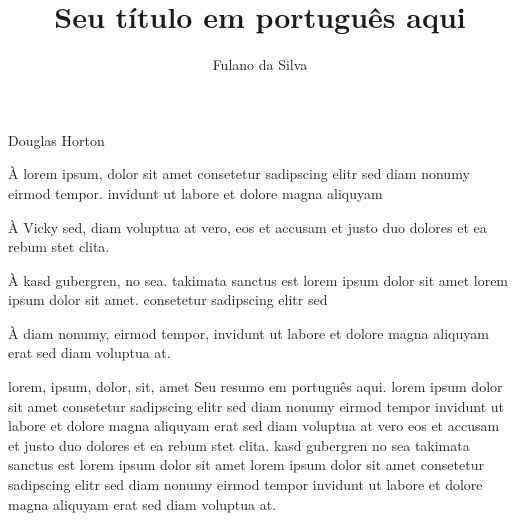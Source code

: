 \documentclass[portuguese]{pucrs-ppgcc}
\author{Fulano da Silva}
\title{Seu título em português aqui}
      {Your title in english here}
\begin{document}

         {Douglas Horton}


\begin{agradecimentos}
À lorem ipsum, dolor sit amet consetetur sadipscing elitr sed diam
nonumy eirmod tempor. invidunt ut labore et dolore magna aliquyam

À Vicky sed, diam voluptua at vero, eos et accusam et justo duo
dolores et ea rebum stet clita.

À kasd gubergren, no sea. takimata sanctus est lorem ipsum dolor sit
amet lorem ipsum dolor sit amet. consetetur sadipscing elitr sed

À diam nonumy, eirmod tempor, invidunt ut labore et dolore magna
aliquyam erat sed diam voluptua at.
\end{agradecimentos}

\begin{resumo}{lorem, ipsum, dolor, sit, amet}
Seu resumo em português aqui. lorem ipsum dolor sit amet
consetetur sadipscing elitr sed diam nonumy eirmod tempor invidunt
ut labore et dolore magna aliquyam erat sed diam voluptua at vero
eos et accusam et justo duo dolores et ea rebum stet clita.  kasd
gubergren no sea takimata sanctus est lorem ipsum dolor sit amet
lorem ipsum dolor sit amet consetetur sadipscing elitr sed diam
nonumy eirmod tempor invidunt ut labore et dolore magna aliquyam
erat sed diam voluptua at.
\end{resumo}
\end{document}
